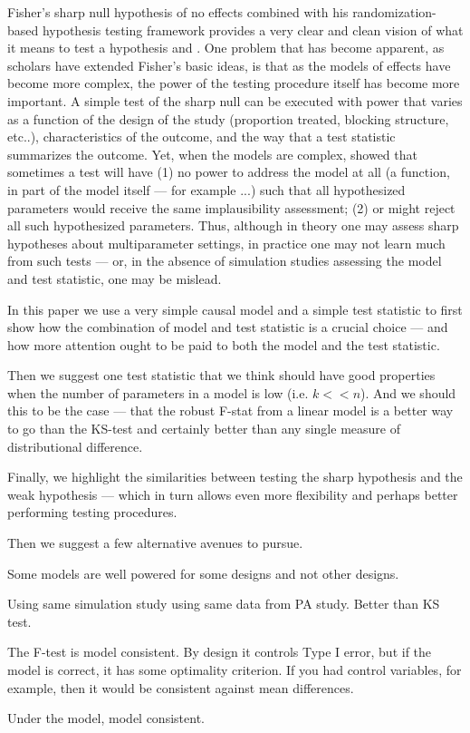 Fisher's sharp null hypothesis of no effects combined with his
randomization-based hypothesis testing framework provides a very clear and
clean vision of what it means to test a hypothesis \citep[Chap
2]{fisher:1935} and \citep{rosenbaum2010design}.
One problem that has become apparent, as scholars have extended Fisher's basic
ideas, is that as the models of effects have become more complex, the power of
the testing procedure itself has become more important. A simple test of the
sharp null can be executed with power that varies as a function of the design
of the study (proportion treated, blocking structure, etc..), characteristics
of the outcome, and the way that a test statistic summarizes the outcome. Yet,
when the models are complex,  \citet{bowers2013sutva} showed that sometimes a
test will have (1) no power to address the model at all (a function, in part
of the model itself --- for example ...) such that all hypothesized parameters
would receive the same implausibility assessment; (2) or might reject all such
hypothesized parameters. Thus, although in theory one may assess sharp
hypotheses about multiparameter settings, in practice one may not learn much
from such tests --- or, in the absence of simulation studies assessing the
model and test statistic, one may be mislead.  

In this paper we use a very simple causal model and a simple test statistic to
first show how the combination of model and test statistic is a crucial choice
--- and how more attention ought to be paid to both the model and the test
statistic.

Then we suggest one test statistic that we think should have good properties
when the number of parameters in a model is low (i.e. $k << n$). And we should
this to be the case --- that the robust F-stat from a linear model is a better
way to go than the KS-test and certainly better than any single measure of
distributional difference.

Finally, we highlight the similarities between testing the sharp hypothesis
and the weak hypothesis --- which in turn allows even more flexibility and
perhaps better performing testing procedures.


Then we suggest a few alternative avenues to pursue.

Some models are well powered for some designs and not other designs.

Using same simulation study using same data from PA study. Better than KS
test. 

The F-test is model consistent. By design it controls Type I error, but if the
model is correct, it has some optimality criterion. If you had control
variables, for example, then it would be consistent against mean differences.

Under the model, model consistent.


